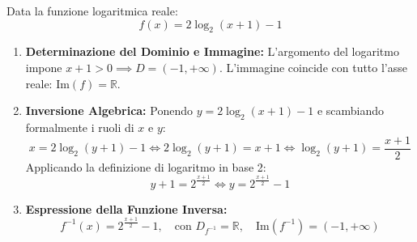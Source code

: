 \documentclass[11pt,a4paper,oneside]{report}
\begin{document}
\begin{metodo}
Data la funzione logaritmica reale:
\begin{equation}
f(x) = 2\log_2(x + 1) - 1
\end{equation}
\begin{enumerate}
\item \textbf{Determinazione del Dominio e Immagine:} L'argomento del logaritmo impone $x + 1 > 0 \implies D = (-1, +\infty)$. L'immagine coincide con tutto l'asse reale: $\mathrm{Im}(f) = \mathbb{R}$.
\item \textbf{Inversione Algebrica:} Ponendo $y = 2\log_2(x + 1) - 1$ e scambiando formalmente i ruoli di $x$ e $y$:
\begin{equation}
x = 2\log_2(y + 1) - 1 \iff 2\log_2(y + 1) = x + 1 \iff \log_2(y + 1) = \frac{x + 1}{2}
\end{equation}
Applicando la definizione di logaritmo in base 2:
\begin{equation}
y + 1 = 2^{\frac{x + 1}{2}} \iff y = 2^{\frac{x + 1}{2}} - 1
\end{equation}
\item \textbf{Espressione della Funzione Inversa:}
\begin{equation}
f^{-1}(x) = 2^{\frac{x + 1}{2}} - 1, \quad \text{con } D_{f^{-1}} = \mathbb{R}, \quad \mathrm{Im}(f^{-1}) = (-1, +\infty)
\end{equation}
\end{enumerate}
\end{metodo}
\end{document}
